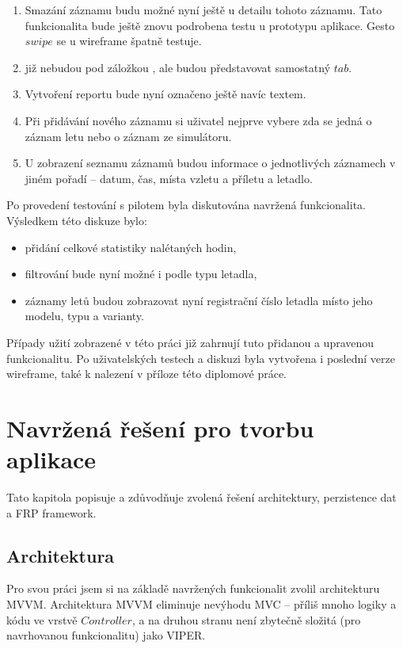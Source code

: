 \documentclass[thesis=M,czech]{FITthesis}[2012/06/26]
\begin{document}
\begin{enumerate}
\item Smazání záznamu budu možné nyní ještě u detailu tohoto záznamu. Tato funkcionalita bude ještě znovu podrobena testu u prototypu aplikace. Gesto $swipe$ se u wireframe špatně testuje.
\item {} již nebudou pod záložkou , ale budou představovat samostatný $tab$.
\item Vytvoření reportu bude nyní označeno ještě navíc textem.
\item Při přidávání nového záznamu si uživatel nejprve vybere zda se jedná o záznam letu nebo o záznam ze simulátoru.
\item U zobrazení seznamu záznamů budou informace o jednotlivých záznamech v jiném pořadí -- datum, čas, místa vzletu a příletu a letadlo.
\end{enumerate}

Po provedení testování s pilotem byla diskutována navržená funkcionalita. Výsledkem této diskuze bylo:
\begin{itemize}
\item přidání celkové statistiky nalétaných hodin,
\item filtrování bude nyní možné i podle typu letadla,
\item záznamy letů budou zobrazovat nyní registrační číslo letadla místo jeho modelu, typu a varianty.
\end{itemize}

Případy užití zobrazené v této práci již zahrnují tuto přidanou a upravenou funkcionalitu. Po uživatelských testech a diskuzi byla vytvořena i poslední verze wireframe, také k nalezení v příloze této diplomové práce.

\section{Navržená řešení pro tvorbu aplikace}
Tato kapitola popisuje a zdůvodňuje zvolená řešení architektury, perzistence dat a FRP framework.

\subsection{Architektura}
Pro svou práci jsem si na základě navržených funkcionalit zvolil architekturu MVVM. Architektura MVVM eliminuje nevýhodu MVC -- příliš mnoho logiky a kódu ve vrstvě $Controller$, a na druhou stranu není zbytečně složitá (pro navrhovanou funkcionalitu) jako VIPER.
\end{document}
